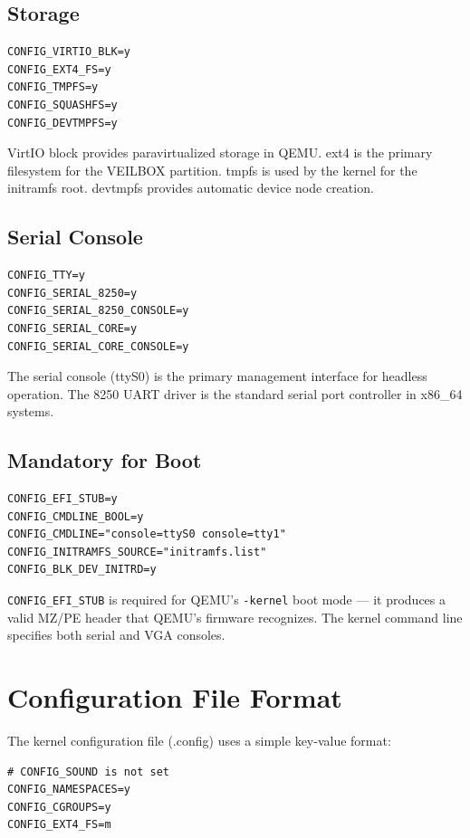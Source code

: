 \subsection{Storage}

\begin{lstlisting}
CONFIG_VIRTIO_BLK=y
CONFIG_EXT4_FS=y
CONFIG_TMPFS=y
CONFIG_SQUASHFS=y
CONFIG_DEVTMPFS=y
\end{lstlisting}

VirtIO block provides paravirtualized storage in QEMU. ext4 is the primary
filesystem for the VEILBOX partition. tmpfs is used by the kernel for
the initramfs root. devtmpfs provides automatic device node creation.

\subsection{Serial Console}

\begin{lstlisting}
CONFIG_TTY=y
CONFIG_SERIAL_8250=y
CONFIG_SERIAL_8250_CONSOLE=y
CONFIG_SERIAL_CORE=y
CONFIG_SERIAL_CORE_CONSOLE=y
\end{lstlisting}

The serial console (ttyS0) is the primary management interface for headless
operation. The 8250 UART driver is the standard serial port controller in
x86\_64 systems.

\subsection{Mandatory for Boot}

\begin{lstlisting}
CONFIG_EFI_STUB=y
CONFIG_CMDLINE_BOOL=y
CONFIG_CMDLINE="console=ttyS0 console=tty1"
CONFIG_INITRAMFS_SOURCE="initramfs.list"
CONFIG_BLK_DEV_INITRD=y
\end{lstlisting}

\texttt{CONFIG\_EFI\_STUB} is required for QEMU's \texttt{-kernel} boot
mode — it produces a valid MZ/PE header that QEMU's firmware recognizes.
The kernel command line specifies both serial and VGA consoles.

\section{Configuration File Format}

The kernel configuration file (.config) uses a simple key-value format:

\begin{lstlisting}
# CONFIG_SOUND is not set
CONFIG_NAMESPACES=y
CONFIG_CGROUPS=y
CONFIG_EXT4_FS=m
\end{lstlisting}

